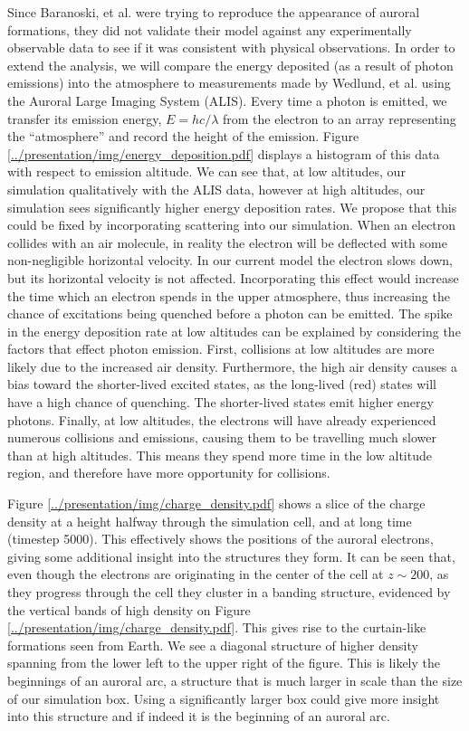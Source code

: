 \documentclass[twocolumn]{article}
\begin{document}
Since Baranoski, et al. were trying to reproduce the appearance of auroral formations, they did not validate their model against any experimentally observable data to see if it was consistent with physical observations.  In order to extend the analysis, we will compare the energy deposited (as a result of photon emissions) into the atmosphere to measurements made by Wedlund, et al. \cite{Wedlund2013} using the Auroral Large Imaging System (ALIS).  Every time a photon is emitted, we transfer its emission energy, $E = hc/\lambda$ from the electron to an array representing the ``atmosphere'' and record the height of the emission.  Figure \ref{../presentation/img/energy_deposition.pdf} displays a histogram of this data with respect to emission altitude.  We can see that, at low altitudes, our simulation qualitatively with the ALIS data, however at high altitudes, our simulation sees significantly higher energy deposition rates.  We propose that this could be fixed by incorporating scattering into our simulation.  When an electron collides with an air molecule, in reality the electron will be deflected with some non-negligible horizontal velocity.  In our current model the electron slows down, but its horizontal velocity is not affected. Incorporating this effect would increase the time which an electron spends in the upper atmosphere, thus increasing the chance of excitations being quenched before a photon can be emitted.
The spike in the energy deposition rate at low altitudes can be explained by considering the factors that effect photon emission. First, collisions at low altitudes are more likely due to the increased air density.  Furthermore, the high air density causes a bias toward the shorter-lived excited states, as the long-lived (red) states will have a high chance of quenching. The shorter-lived states emit higher energy photons.  Finally, at low altitudes, the electrons will have already experienced numerous collisions and emissions, causing them to be travelling much slower than at high altitudes. This means they spend more time in the low altitude region, and therefore have more opportunity for collisions.

Figure \ref{../presentation/img/charge_density.pdf} shows a slice of the charge density at a height halfway through the simulation cell, and at long time (timestep 5000).   This effectively shows the positions of the auroral electrons, giving some additional insight into the structures they form. It can be seen that, even though the electrons are originating in the center of the cell at $z\sim 200$, as they progress through the cell they cluster in a banding structure, evidenced by the vertical bands of high density on Figure \ref{../presentation/img/charge_density.pdf}.  This gives rise to the curtain-like formations seen from Earth.  We see a diagonal structure of higher density spanning from the lower left to the upper right of the figure.  This is likely the beginnings of an auroral arc, a structure that is much larger in scale than the size of our simulation box.  Using a significantly larger box could give more insight into this structure and if indeed it is the beginning of an auroral arc.
\end{document}
